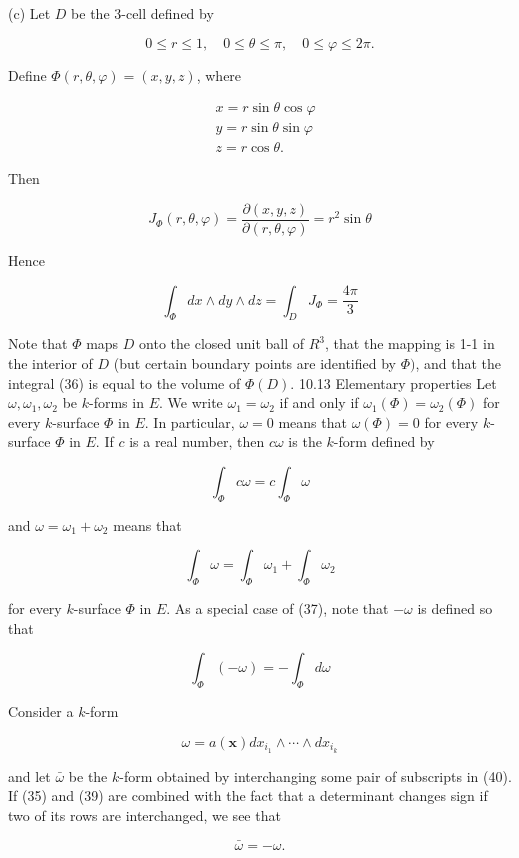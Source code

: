 \documentclass[10pt]{article}
\begin{document}
(c) Let $D$ be the 3-cell defined by

$$
0 \leq r \leq 1, \quad 0 \leq \theta \leq \pi, \quad 0 \leq \varphi \leq 2 \pi .
$$

Define $\Phi(r, \theta, \varphi)=(x, y, z)$, where

$$
\begin{aligned}
& x=r \sin \theta \cos \varphi \\
& y=r \sin \theta \sin \varphi \\
& z=r \cos \theta .
\end{aligned}
$$

Then

$$
J_{\Phi}(r, \theta, \varphi)=\frac{\partial(x, y, z)}{\partial(r, \theta, \varphi)}=r^{2} \sin \theta
$$

Hence

$$
\int_{\Phi} d x \wedge d y \wedge d z=\int_{D} J_{\Phi}=\frac{4 \pi}{3}
$$

Note that $\Phi$ maps $D$ onto the closed unit ball of $R^{3}$, that the mapping is 1-1 in the interior of $D$ (but certain boundary points are identified by $\Phi)$, and that the integral (36) is equal to the volume of $\Phi(D)$. 10.13 Elementary properties Let $\omega, \omega_{1}, \omega_{2}$ be $k$-forms in $E$. We write $\omega_{1}=\omega_{2}$ if and only if $\omega_{1}(\Phi)=\omega_{2}(\Phi)$ for every $k$-surface $\Phi$ in $E$. In particular, $\omega=0$ means that $\omega(\Phi)=0$ for every $k$-surface $\Phi$ in $E$. If $c$ is a real number, then $c \omega$ is the $k$-form defined by

$$
\int_{\Phi} c \omega=c \int_{\Phi} \omega
$$

and $\omega=\omega_{1}+\omega_{2}$ means that

$$
\int_{\Phi} \omega=\int_{\Phi} \omega_{1}+\int_{\Phi} \omega_{2}
$$

for every $k$-surface $\Phi$ in $E$. As a special case of (37), note that $-\omega$ is defined so that

$$
\int_{\Phi}(-\omega)=-\int_{\Phi} d \omega
$$

Consider a $k$-form

$$
\omega=a(\mathbf{x}) d x_{i_{1}} \wedge \cdots \wedge d x_{i_{k}}
$$

and let $\bar{\omega}$ be the $k$-form obtained by interchanging some pair of subscripts in (40). If (35) and (39) are combined with the fact that a determinant changes sign if two of its rows are interchanged, we see that

$$
\bar{\omega}=-\omega .
$$
\end{document}
